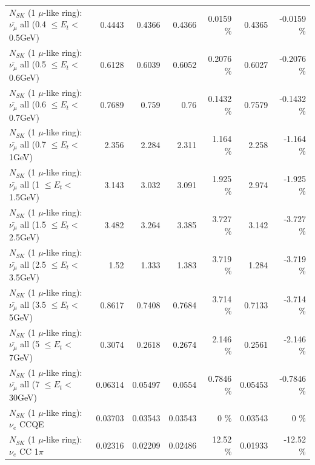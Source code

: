 \begin{table}
\begin{tabular}{| l | r | r | r  r | r  r |}
 $N_{SK}$ (1 $\mu$-like ring): $\bar{\nu_{\mu}}$ all (0.4 $\leq E_{t} <$ 0.5GeV) &          0.4443 &          0.4366 &          0.4366 &   0.0159 \%  &          0.4365 &  -0.0159 \%  \\ 
 $N_{SK}$ (1 $\mu$-like ring): $\bar{\nu_{\mu}}$ all (0.5 $\leq E_{t} <$ 0.6GeV) &          0.6128 &          0.6039 &          0.6052 &   0.2076 \%  &          0.6027 &  -0.2076 \%  \\ 
 $N_{SK}$ (1 $\mu$-like ring): $\bar{\nu_{\mu}}$ all (0.6 $\leq E_{t} <$ 0.7GeV) &          0.7689 &           0.759 &            0.76 &   0.1432 \%  &          0.7579 &  -0.1432 \%  \\ 
   $N_{SK}$ (1 $\mu$-like ring): $\bar{\nu_{\mu}}$ all (0.7 $\leq E_{t} <$ 1GeV) &           2.356 &           2.284 &           2.311 &    1.164 \%  &           2.258 &   -1.164 \%  \\ 
   $N_{SK}$ (1 $\mu$-like ring): $\bar{\nu_{\mu}}$ all (1 $\leq E_{t} <$ 1.5GeV) &           3.143 &           3.032 &           3.091 &    1.925 \%  &           2.974 &   -1.925 \%  \\ 
 $N_{SK}$ (1 $\mu$-like ring): $\bar{\nu_{\mu}}$ all (1.5 $\leq E_{t} <$ 2.5GeV) &           3.482 &           3.264 &           3.385 &    3.727 \%  &           3.142 &   -3.727 \%  \\ 
 $N_{SK}$ (1 $\mu$-like ring): $\bar{\nu_{\mu}}$ all (2.5 $\leq E_{t} <$ 3.5GeV) &            1.52 &           1.333 &           1.383 &    3.719 \%  &           1.284 &   -3.719 \%  \\ 
   $N_{SK}$ (1 $\mu$-like ring): $\bar{\nu_{\mu}}$ all (3.5 $\leq E_{t} <$ 5GeV) &          0.8617 &          0.7408 &          0.7684 &    3.714 \%  &          0.7133 &   -3.714 \%  \\ 
     $N_{SK}$ (1 $\mu$-like ring): $\bar{\nu_{\mu}}$ all (5 $\leq E_{t} <$ 7GeV) &          0.3074 &          0.2618 &          0.2674 &    2.146 \%  &          0.2561 &   -2.146 \%  \\ 
    $N_{SK}$ (1 $\mu$-like ring): $\bar{\nu_{\mu}}$ all (7 $\leq E_{t} <$ 30GeV) &         0.06314 &         0.05497 &          0.0554 &   0.7846 \%  &         0.05453 &  -0.7846 \%  \\ 
\hline
\hline
\hline
                                      $N_{SK}$ (1 $\mu$-like ring): $\nu_e$ CCQE &         0.03703 &         0.03543 &         0.03543 &        0 \%  &         0.03543 &        0 \%  \\ 
                                 $N_{SK}$ (1 $\mu$-like ring): $\nu_e$ CC 1$\pi$ &         0.02316 &         0.02209 &         0.02486 &    12.52 \%  &         0.01933 &   -12.52 \%  \\ 

\end{tabular}
\end{table}
